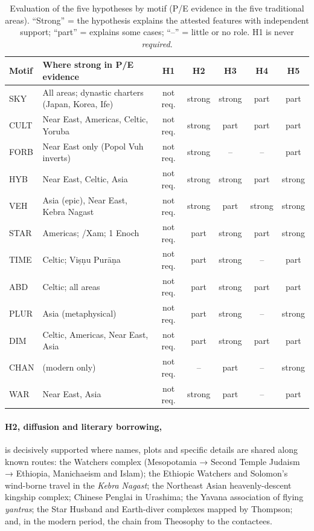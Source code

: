 \documentclass[11pt,a4paper]{article}
\begin{document}
\begin{table}[ht]
\centering\footnotesize
\caption{Evaluation of the five hypotheses by motif (P/E evidence in the five traditional areas). ``Strong'' = the hypothesis explains the attested features with independent support; ``part'' = explains some cases; ``--'' = little or no role. H1 is never \emph{required}.}\label{tab:hyp}
\begin{tabularx}{\textwidth}{@{}lXccccc@{}}
\toprule
Motif & Where strong in P/E evidence & H1 & H2 & H3 & H4 & H5 \\
\midrule
SKY & All areas; dynastic charters (Japan, Korea, Ife) & not req. & strong & strong & part & part \\
CULT & Near East, Americas, Celtic, Yoruba & not req. & strong & part & part & part \\
FORB & Near East only (Popol Vuh inverts) & not req. & strong & -- & -- & part \\
HYB & Near East, Celtic, Asia & not req. & strong & strong & part & strong \\
VEH & Asia (epic), Near East, Kebra Nagast & not req. & strong & part & strong & strong \\
STAR & Americas; /Xam; 1 Enoch & not req. & part & strong & part & strong \\
TIME & Celtic; Viṣṇu Purāṇa & not req. & part & strong & -- & part \\
ABD & Celtic; all areas & not req. & part & strong & part & part \\
PLUR & Asia (metaphysical) & not req. & part & strong & -- & strong \\
DIM & Celtic, Americas, Near East, Asia & not req. & part & strong & part & part \\
CHAN & (modern only) & not req. & -- & part & -- & strong \\
WAR & Near East, Asia & not req. & strong & part & -- & part \\
\bottomrule
\end{tabularx}
\end{table}

\paragraph{H2, diffusion and literary borrowing,} is decisively supported where names, plots and specific details are shared along known routes: the Watchers complex (Mesopotamia → Second Temple Judaism → Ethiopia, Manichaeism and Islam); the Ethiopic Watchers and Solomon's wind-borne travel in the \emph{Kebra Nagast}; the Northeast Asian heavenly-descent kingship complex; Chinese Penglai in Urashima; the Yavana association of flying \emph{yantras}; the Star Husband and Earth-diver complexes mapped by Thompson; and, in the modern period, the chain from Theosophy to the contactees.
\end{document}

